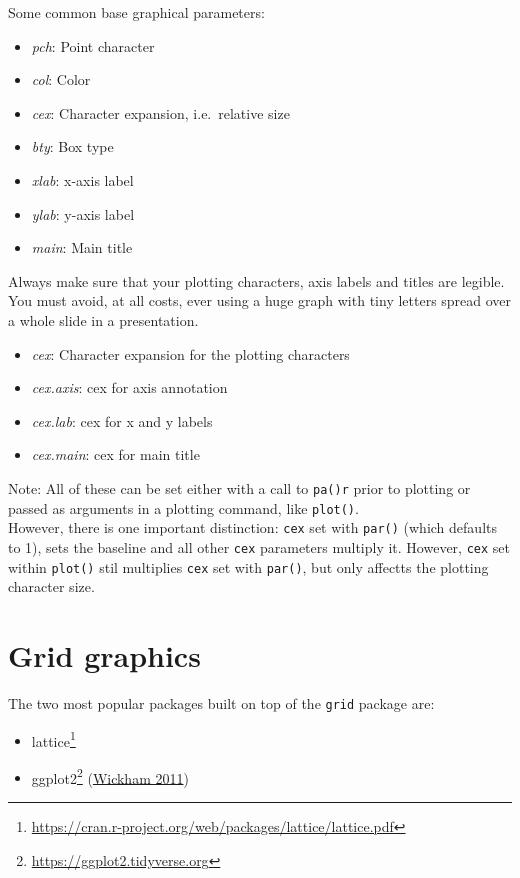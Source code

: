 \documentclass[
]{book}
\DeclareRobustCommand{\href}[2]{#2\footnote{\url{#1}}}
\providecommand{\tightlist}{%
  \setlength{\itemsep}{0pt}\setlength{\parskip}{0pt}}
\begin{document}
Some common base graphical parameters:

\begin{itemize}
\tightlist
\item
  \emph{pch}: Point character
\item
  \emph{col}: Color
\item
  \emph{cex}: Character expansion, i.e.~relative size
\item
  \emph{bty}: Box type
\item
  \emph{xlab}: x-axis label
\item
  \emph{ylab}: y-axis label
\item
  \emph{main}: Main title
\end{itemize}

Always make sure that your plotting characters, axis labels and titles are legible. You must avoid, at all costs, ever using a huge graph with tiny letters spread over a whole slide in a presentation.

\begin{itemize}
\tightlist
\item
  \emph{cex}: Character expansion for the plotting characters
\item
  \emph{cex.axis}: cex for axis annotation
\item
  \emph{cex.lab}: cex for x and y labels
\item
  \emph{cex.main}: cex for main title
\end{itemize}

Note: All of these can be set either with a call to \texttt{pa()r} prior to plotting or passed as arguments in a plotting command, like \texttt{plot()}.\\
However, there is one important distinction: \texttt{cex} set with \texttt{par()} (which defaults to 1), sets the baseline and all other \texttt{cex} parameters multiply it. However, \texttt{cex} set within \texttt{plot()} stil multiplies \texttt{cex} set with \texttt{par()}, but only affectts the plotting character size.

\hypertarget{grid-graphics}{%
\section{Grid graphics}\label{grid-graphics}}

The two most popular packages built on top of the \texttt{grid} package are:

\begin{itemize}
\tightlist
\item
  \href{https://cran.r-project.org/web/packages/lattice/lattice.pdf}{lattice}
\item
  \href{https://ggplot2.tidyverse.org}{ggplot2} (\protect\hyperlink{ref-wickham2011ggplot2}{Wickham 2011})
\end{itemize}
\end{document}
